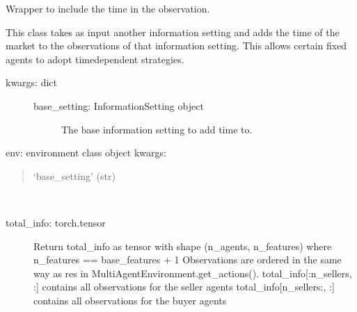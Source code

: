\documentclass[letterpaper,10pt,english]{sphinxmanual}
\begin{document}

\begin{fulllineitems}
\label{\detokenize{MultiAgentMarketRL:info_setting.TimeInformationWrapper}}
\sphinxAtStartPar
Wrapper to include the time in the observation.

\sphinxAtStartPar
This class takes as input another information setting and adds the time
of the market to the observations of that information setting. This allows
certain fixed agents to adopt time\sphinxhyphen{}dependent strategies.
\begin{description}
\item[{kwargs: dict}] \leavevmode\begin{description}
\item[{base\_setting: InformationSetting object}] \leavevmode
\sphinxAtStartPar
The base information setting to add time to.

\end{description}

\end{description}

\begin{fulllineitems}
\label{\detokenize{MultiAgentMarketRL:info_setting.TimeInformationWrapper.__init__}}
\sphinxAtStartPar
env: environment class object
kwargs:
\begin{quote}

\sphinxAtStartPar
‘base\_setting’ (str)
\end{quote}

\end{fulllineitems}


\begin{fulllineitems}
\label{\detokenize{MultiAgentMarketRL:info_setting.TimeInformationWrapper.get_states}}~\begin{description}
\item[{total\_info: torch.tensor}] \leavevmode
\sphinxAtStartPar
Return total\_info as tensor with shape (n\_agents, n\_features) where n\_features == base\_features + 1
Observations are ordered in the same way as res in MultiAgentEnvironment.get\_actions().
total\_info{[}:n\_sellers, :{]} contains all observations for the seller agents
total\_info{[}n\_sellers:, :{]} contains all observations for the buyer agents


\end{description}
\end{fulllineitems}
\end{fulllineitems}
\end{document}
